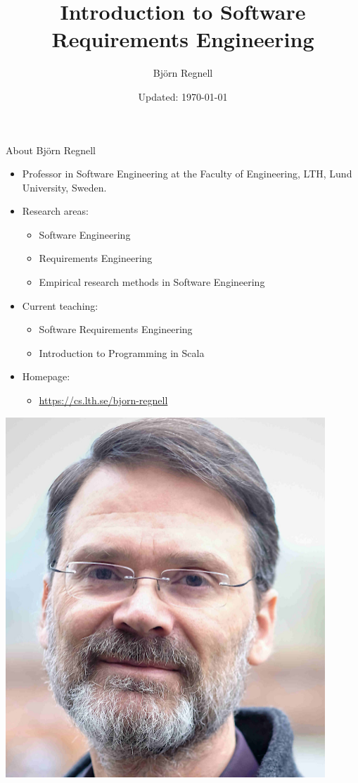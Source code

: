 \documentclass{beamer}
\author{Björn Regnell}
\title{Introduction to Software\\Requirements Engineering}
\date{\footnotesize Updated: \today}
\begin{document}
\maketitle

\begin{frame}[fragile]{About Björn Regnell}
\begin{minipage}[t][1.0\textheight]{0.78\textwidth}
\vspace{0pt}
\begin{itemize}
\item Professor in Software Engineering at the Faculty of Engineering, LTH, Lund University, Sweden.
\item Research areas: 
\begin{itemize}
\item Software Engineering
\item Requirements Engineering 
\item Empirical research methods in Software Engineering 
\end{itemize}
\item Current teaching: 
\begin{itemize}
\item Software Requirements Engineering
\item Introduction to Programming in Scala 
\end{itemize}
\item Homepage: 
\begin{itemize}
\item \url{https://cs.lth.se/bjorn-regnell}
\end{itemize}
\end{itemize}
\end{minipage}%
\hspace*{1em}\begin{minipage}[t][1.0\textheight]{0.22\textwidth}
\vspace{0pt}\hfill\includegraphics[width=0.9\textwidth]{img/bjorn-regnell}
\end{minipage}%
\end{frame}
\end{document}
